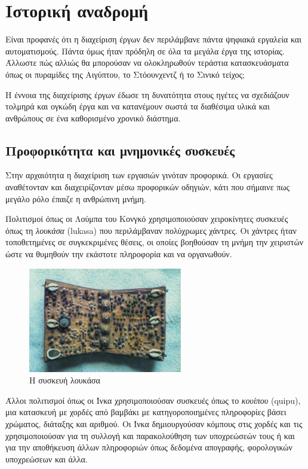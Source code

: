     \section{Ιστορική αναδρομή}
        Είναι προφανές ότι η διαχείριση έργων δεν περιλάμβανε πάντα ψηφιακά εργαλεία και αυτοματισμούς. Πάντα όμως ήταν πρόδηλη σε όλα τα μεγάλα έργα της ιστορίας. Άλλωστε πώς αλλιώς θα μπορούσαν να ολοκληρωθούν τεράστια κατασκευάσματα όπως οι πυραμίδες της Αιγύπτου, το Στόουνχεντζ ή το Σινικό τείχος;
        
        Η έννοια της διαχείρισης έργων έδωσε τη δυνατότητα στους ηγέτες να σχεδιάζουν τολμηρά και ογκώδη έργα και να κατανέμουν σωστά τα διαθέσιμα υλικά και ανθρώπους σε ένα καθορισμένο χρονικό διάστημα.
        
        \subsection{Προφορικότητα και μνημονικές συσκευές}
            Στην αρχαιότητα η διαχείριση των εργασιών γινόταν προφορικά. Οι εργασίες αναθέτονταν και διαχειρίζονταν μέσω προφορικών οδηγιών, κάτι που σήμαινε πως μεγάλο ρόλο έπαιζε η ανθρώπινη μνήμη. \cite{Goody2013}

            Πολιτισμοί όπως οι Λούμπα του Κονγκό χρησιμοποιούσαν χειροκίνητες συσκευές όπως τη \textit{λουκάσα} (lukasa) που περιλάμβαναν πολύχρωμες χάντρες. Οι χάντρες ήταν τοποθετημένες σε συγκεκριμένες θέσεις, οι οποίες βοηθούσαν τη μνήμη την χειριστών ώστε να θυμηθούν την εκάστοτε πληροφορία και να οργανωθούν. \cite{Lukasa}

            \begin{figure}[H] \noindent \centering
                \includegraphics[width=0.6\textwidth]{img/Lukasa.jpg}
                \caption{Η συσκευή λουκάσα}
            \end{figure}
            
            Άλλοι πολιτισμοί όπως οι Ίνκα χρησιμοποιούσαν συσκευές όπως το \textit{κουίπου} \linebreak (quipu), μια κατασκευή με χορδές από βαμβάκι με κατηγοροποιημένες πληροφορίες βάσει χρώματος, διάταξης και αριθμού. Οι Ίνκα δημιουργούσαν κόμπους στις χορδές και τις χρησιμοποιούσαν για τη συλλογή και παρακολούθηση των υποχρεώσεών τους ή και για την αποθήκευση άλλων πληροφοριών όπως δεδομένα απογραφής, φορολογικών υποχρεώσεων και άλλα. \cite{Quipu}

